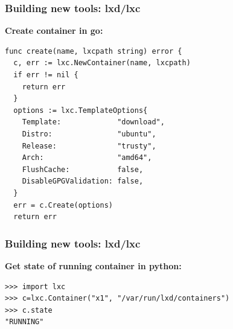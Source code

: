 \documentclass{beamer}
\begin{document}
\begin{frame}[fragile]
\frametitle{Building new tools: lxd/lxc}
{\bf Create container in go:} \\
{\tiny
\begin{lstlisting}
func create(name, lxcpath string) error {
  c, err := lxc.NewContainer(name, lxcpath)
  if err != nil {
    return err
  }
  options := lxc.TemplateOptions{
    Template:             "download",
    Distro:               "ubuntu",
    Release:              "trusty",
    Arch:                 "amd64",
    FlushCache:           false,
    DisableGPGValidation: false,
  }
  err = c.Create(options)
  return err
\end{lstlisting}
}
\end{frame}

\begin{frame}[fragile]
\frametitle{Building new tools: lxd/lxc}
{\bf Get state of running container in python:} \\
{\tiny
\begin{lstlisting}
>>> import lxc
>>> c=lxc.Container("x1", "/var/run/lxd/containers")
>>> c.state
"RUNNING"
\end{lstlisting}
}
\end{frame}

\end{document}
